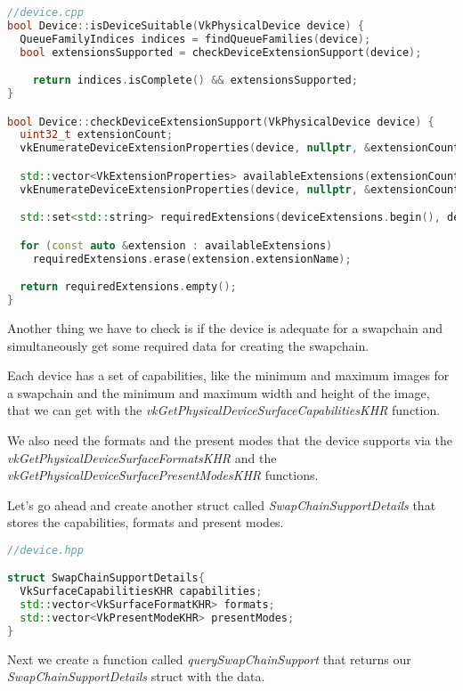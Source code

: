 \documentclass[12pt]{report} \usepackage{preamble}
\begin{document}
\begin{lstlisting}[language=C++]
//device.cpp
bool Device::isDeviceSuitable(VkPhysicalDevice device) {
  QueueFamilyIndices indices = findQueueFamilies(device);
  bool extensionsSupported = checkDeviceExtensionSupport(device);

	return indices.isComplete() && extensionsSupported;
}

bool Device::checkDeviceExtensionSupport(VkPhysicalDevice device) {
  uint32_t extensionCount;
  vkEnumerateDeviceExtensionProperties(device, nullptr, &extensionCount, nullptr);

  std::vector<VkExtensionProperties> availableExtensions(extensionCount);
  vkEnumerateDeviceExtensionProperties(device, nullptr, &extensionCount, availableExtensions.data());

  std::set<std::string> requiredExtensions(deviceExtensions.begin(), deviceExtensions.end());

  for (const auto &extension : availableExtensions)
    requiredExtensions.erase(extension.extensionName);

  return requiredExtensions.empty();
}
\end{lstlisting}

Another thing we have to check is if the device is adequate for a swapchain and simultaneously
get some required data for creating the swapchain.

Each device has a set of capabilities, like the minimum and maximum images for a swapchain
and the minimum and maximum width and height of the image, that we can get with the
\textit{vkGetPhysicalDeviceSurfaceCapabilitiesKHR} function.

We also need the formats and the present modes that the device supports via the
\textit{vkGetPhysicalDeviceSurfaceFormatsKHR} and the \textit{vkGetPhysicalDeviceSurfacePresentModesKHR}
functions.

Let's go ahead and create another struct called \textit{SwapChainSupportDetails} that stores the capabilities,
formats and present modes.

\begin{lstlisting}[language=C++]
//device.hpp

struct SwapChainSupportDetails{
  VkSurfaceCapabilitiesKHR capabilities;
  std::vector<VkSurfaceFormatKHR> formats;
  std::vector<VkPresentModeKHR> presentModes;
}
\end{lstlisting}

Next we create a function called \textit{querySwapChainSupport} that returns our
\textit{SwapChainSupportDetails} struct with the data.
\end{document}
